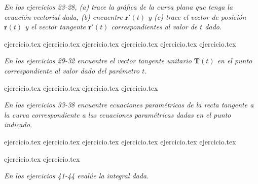 \vspace{0.3cm}
\noindent\textit{En los ejercicios 23-28, (a) trace la gráfica de la curva plana que tenga la ecuación vectorial dada, (b) encuentre $\mathbf{r}'(t)$ y (c) trace el vector de posición $\mathbf{r}(t)$ y el vector tangente $\mathbf{r}'(t)$ correspondientes al valor de $t$ dado.}

\begin{enumerate}
    \setcounter{enumi}{22}
    {ejercicio.tex}
{ejercicio.tex}
{ejercicio.tex}
{ejercicio.tex}
{ejercicio.tex}
{ejercicio.tex}
\end{enumerate}

\vspace{0.3cm}
\noindent\textit{En los ejercicios 29-32 encuentre el vector tangente unitario $\mathbf{T}(t)$ en el punto correspondiente al valor dado del parámetro $t$.}

\begin{enumerate}
    \setcounter{enumi}{28}
    {ejercicio.tex}
{ejercicio.tex}
{ejercicio.tex}
{ejercicio.tex}
\end{enumerate}

\vspace{0.3cm}
\noindent\textit{En los ejercicios 33-38 encuentre ecuaciones paramétricas de la recta tangente a la curva correspondiente a las ecuaciones paramétricas dadas en el punto indicado.}

\begin{enumerate}
    \setcounter{enumi}{32}
    {ejercicio.tex}
{ejercicio.tex}
{ejercicio.tex}
{ejercicio.tex}
{ejercicio.tex}
{ejercicio.tex}
\end{enumerate}

\vspace{0.3cm}
\begin{enumerate}
    \setcounter{enumi}{38}
    {ejercicio.tex}
{ejercicio.tex}
\end{enumerate}

\vspace{0.3cm}
\noindent\textit{En los ejercicios 41-44 evalúe la integral dada.}


